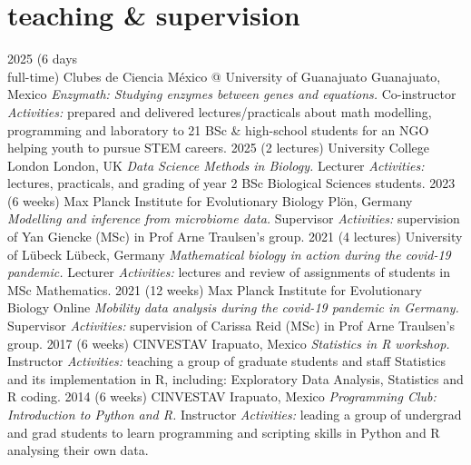 \documentclass[]{friggeri-cv} %
\begin{document}
\pagebreak
\section{teaching \& supervision}

\begin{entrylist}
\entry
{2025}
{(6 days\\ full-time)}
{Clubes de Ciencia México @ University of Guanajuato}
{Guanajuato, Mexico}
{{\normalsize\emph{Enzymath: Studying enzymes between genes and equations.} Co-instructor}}
{\emph{Activities:} prepared and delivered lectures/practicals about math modelling, programming and laboratory to 21 BSc \& high-school students for an NGO helping youth to pursue STEM careers.
}
\entry
{2025}
{(2 lectures)}
{University College London}
{London, UK}
{{\normalsize\emph{Data Science Methods in Biology.} Lecturer}}
{\emph{Activities:} lectures, practicals, and grading of year 2 BSc Biological Sciences students.
}
\entry
{2023}
{(6 weeks)}
{Max Planck Institute for Evolutionary Biology}
{Plön, Germany}
{{\normalsize\emph{Modelling and inference from microbiome data.} Supervisor}}
{\emph{Activities:} supervision of Yan Giencke (MSc) in Prof Arne Traulsen's group.
}
\entry
{2021}
{(4 lectures)}
{University of Lübeck}
{Lübeck, Germany}
{{\normalsize\emph{Mathematical biology in action during the covid-19 pandemic.} Lecturer}}
{\emph{Activities:} lectures and review of assignments of students in MSc Mathematics.
}
\entry
{2021}
{(12 weeks)}
{Max Planck Institute for Evolutionary Biology}
{Online}
{{\normalsize\emph{Mobility data analysis during the covid-19 pandemic in Germany.} Supervisor}}
{\emph{Activities:} supervision of Carissa Reid (MSc) in Prof Arne Traulsen's group.
}
\entry
{2017}
{(6 weeks)}
{CINVESTAV}
{Irapuato, Mexico}
{{\normalsize\emph{Statistics in R workshop.} Instructor}}
{\emph{Activities:} teaching a group of graduate students and staff Statistics and its implementation in R, including: Exploratory Data Analysis, Statistics and R coding.
}
\entry
{2014}
{(6 weeks)}
{CINVESTAV}
{Irapuato, Mexico}
{{\normalsize\emph{Programming Club: Introduction to Python and R.} Instructor}}
{\emph{Activities:} leading a group of undergrad and grad students to learn programming and scripting skills in Python and R analysing their own data.
}
\end{entrylist}
\end{document}
